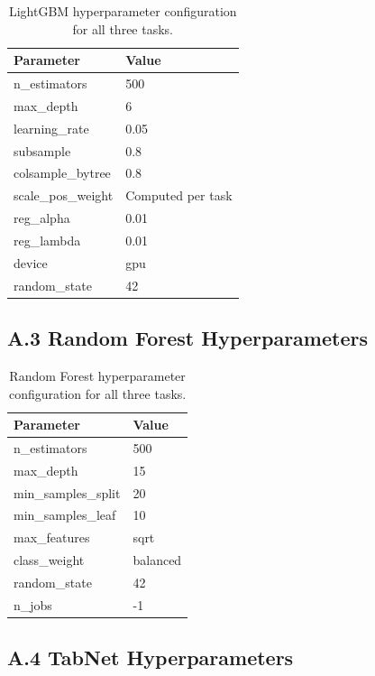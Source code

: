 \documentclass[11pt]{article}
\begin{document}
\begin{table}[H]
\centering
\caption{LightGBM hyperparameter configuration for all three tasks.}
\begin{tabular}{@{}ll@{}}
\toprule
\textbf{Parameter} & \textbf{Value} \\
\midrule
n\_estimators & 500 \\
max\_depth & 6 \\
learning\_rate & 0.05 \\
subsample & 0.8 \\
colsample\_bytree & 0.8 \\
scale\_pos\_weight & Computed per task \\
reg\_alpha & 0.01 \\
reg\_lambda & 0.01 \\
device & gpu \\
random\_state & 42 \\
\bottomrule
\end{tabular}
\end{table}

\subsection{A.3 Random Forest Hyperparameters}

\begin{table}[H]
\centering
\caption{Random Forest hyperparameter configuration for all three tasks.}
\begin{tabular}{@{}ll@{}}
\toprule
\textbf{Parameter} & \textbf{Value} \\
\midrule
n\_estimators & 500 \\
max\_depth & 15 \\
min\_samples\_split & 20 \\
min\_samples\_leaf & 10 \\
max\_features & sqrt \\
class\_weight & balanced \\
random\_state & 42 \\
n\_jobs & -1 \\
\bottomrule
\end{tabular}
\end{table}

\subsection{A.4 TabNet Hyperparameters}
\end{document}
